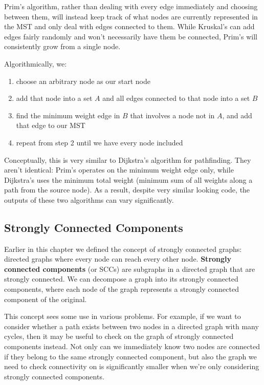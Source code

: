 Prim's algorithm, rather than dealing with every edge immediately and choosing between them, will instead keep track of what nodes are currently represented in the MST and only deal with edges connected to them. While Kruskal's can add edges fairly randomly and won't necessarily have them be connected, Prim's will consistently grow from a single node.

Algorithmically, we:
\begin{enumerate}
\item choose an arbitrary node as our start node
\item add that node into a set $A$ and all edges connected to that node into a set $B$
\item find the minimum weight edge in $B$ that involves a node not in $A$, and add that edge to our MST
\item repeat from step 2 until we have every node included
\end{enumerate}

Conceptually, this is very similar to Dijkstra's algorithm for pathfinding. They aren't identical: Prim's operates on the minimum weight edge only, while Dijkstra's uses the minimum total weight (minimum sum of all weights along a path from the source node). As a result, despite very similar looking code, the outputs of these two algorithms can vary significantly.

\subsection{Strongly Connected Components}

Earlier in this chapter we defined the concept of strongly connected graphs: directed graphs where every node can reach every other node. \textbf{Strongly connected components} (or SCCs) are subgraphs in a directed graph that are strongly connected. We can decompose a graph into its strongly connected components, where each node of the graph represents a strongly connected component of the original.

This concept sees some use in various problems. For example, if we want to consider whether a path exists between two nodes in a directed graph with many cycles, then it may be useful to check on the graph of strongly connected components instead. Not only can we immediately know two nodes are connected if they belong to the same strongly connected component, but also the graph we need to check connectivity on is significantly smaller when we're only considering strongly connected components.

